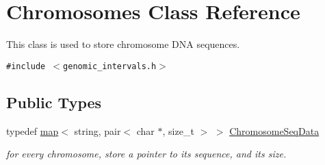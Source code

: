\hypertarget{classChromosomes}{
\section{Chromosomes Class Reference}
\label{classChromosomes}
}
This class is used to store chromosome DNA sequences.  


{\tt \#include $<$genomic\_\-intervals.h$>$}

\subsection*{Public Types}
\begin{CompactItemize}
\item 
\hypertarget{classChromosomes_4a233d2b7fabc1a589cbbafd5d0ea243}{
typedef \hyperlink{classChromosomes_8e40e7c99c6c0a40713c7785ba5b5ac4}{map}$<$ string, pair$<$ char $\ast$, size\_\-t $>$ $>$ \hyperlink{classChromosomes_4a233d2b7fabc1a589cbbafd5d0ea243}{ChromosomeSeqData}}
\label{classChromosomes_4a233d2b7fabc1a589cbbafd5d0ea243}

\begin{CompactList}\small\item\em for every chromosome, store a pointer to its sequence, and its size. \item\end{CompactList}\end{CompactItemize}

